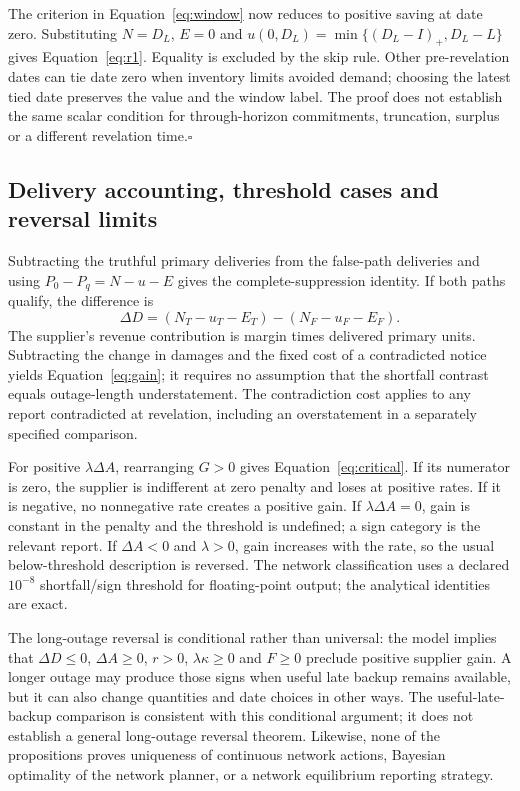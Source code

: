\documentclass[preprint,11pt,authoryear]{elsarticle}
\begin{document}
The criterion in Equation~\eqref{eq:window} now reduces to positive saving at date zero. Substituting $N=D_L$, $E=0$ and $u(0,D_L)=\min\{(D_L-I)_+,D_L-L\}$ gives Equation~\eqref{eq:r1}. Equality is excluded by the skip rule. Other pre-revelation dates can tie date zero when inventory limits avoided demand; choosing the latest tied date preserves the value and the window label. The proof does not establish the same scalar condition for through-horizon commitments, truncation, surplus or a different revelation time.\hfill$\square$

\subsection{Delivery accounting, threshold cases and reversal limits}
Subtracting the truthful primary deliveries from the false-path deliveries and using $P_0-P_q=N-u-E$ gives the complete-suppression identity. If both paths qualify, the difference is
\[
 \Delta D=(N_T-u_T-E_T)-(N_F-u_F-E_F).
\]
The supplier's revenue contribution is margin times delivered primary units. Subtracting the change in damages and the fixed cost of a contradicted notice yields Equation~\eqref{eq:gain}; it requires no assumption that the shortfall contrast equals outage-length understatement. The contradiction cost applies to any report contradicted at revelation, including an overstatement in a separately specified comparison.

For positive $\lambda\Delta A$, rearranging $G>0$ gives Equation~\eqref{eq:critical}. If its numerator is zero, the supplier is indifferent at zero penalty and loses at positive rates. If it is negative, no nonnegative rate creates a positive gain. If $\lambda\Delta A=0$, gain is constant in the penalty and the threshold is undefined; a sign category is the relevant report. If $\Delta A<0$ and $\lambda>0$, gain increases with the rate, so the usual below-threshold description is reversed. The network classification uses a declared $10^{-8}$ shortfall/sign threshold for floating-point output; the analytical identities are exact.

The long-outage reversal is conditional rather than universal: the model implies that $\Delta D\le0$, $\Delta A\ge0$, $r>0$, $\lambda\kappa\ge0$ and $F\ge0$ preclude positive supplier gain. A longer outage may produce those signs when useful late backup remains available, but it can also change quantities and date choices in other ways. The useful-late-backup comparison is consistent with this conditional argument; it does not establish a general long-outage reversal theorem. Likewise, none of the propositions proves uniqueness of continuous network actions, Bayesian optimality of the network planner, or a network equilibrium reporting strategy.
\end{document}
